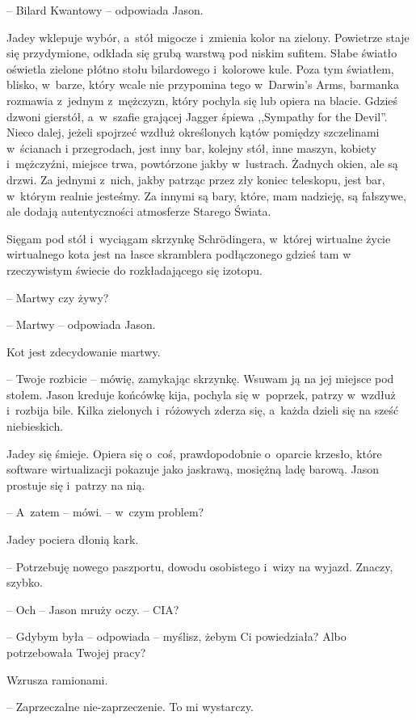 \documentclass[oneside,polish,12pt,sfheadings]{mwbk}
\begin{document}
-- Bilard Kwantowy -- odpowiada Jason.

Jadey wklepuje wybór, a~stół migocze i~zmienia kolor na zielony.
Powietrze staje się przydymione, odkłada się grubą warstwą pod niskim
sufitem. Słabe światło oświetla zielone płótno stołu bilardowego i~kolorowe kule. Poza tym światłem, blisko, w~barze, który wcale nie
przypomina tego w~Darwin's Arms, barmanka rozmawia z~jednym z~mężczyzn,
który pochyla się lub opiera na blacie. Gdzieś dzwoni gierstół, a~w~szafie grającej Jagger śpiewa ,,Sympathy for the Devil''. Nieco dalej,
jeżeli spojrzeć wzdłuż określonych kątów pomiędzy szczelinami w~ścianach
i przegrodach, jest inny bar, kolejny stół, inne maszyn, kobiety i~mężczyźni, miejsce trwa, powtórzone jakby w~lustrach. Żadnych okien, ale
są drzwi. Za jednymi z~nich, jakby patrząc przez zły koniec teleskopu,
jest bar, w~którym realnie jesteśmy. Za innymi są bary, które, mam
nadzieję, są fałszywe, ale dodają autentyczności atmosferze Starego
Świata.

Sięgam pod stół i~wyciągam skrzynkę Schrödingera, w~której wirtualne
życie wirtualnego kota jest na łasce skramblera podłączonego gdzieś tam
w rzeczywistym świecie do rozkładającego się izotopu.

-- Martwy czy żywy?

-- Martwy -- odpowiada Jason.

Kot jest zdecydowanie martwy.

-- Twoje rozbicie -- mówię, zamykając skrzynkę. Wsuwam ją na jej miejsce
pod stołem. Jason kreduje końcówkę kija, pochyla się w~poprzek, patrzy w~wzdłuż i~rozbija bile. Kilka zielonych i~różowych zderza się, a~każda
dzieli się na sześć niebieskich.

Jadey się śmieje. Opiera się o~coś, prawdopodobnie o~oparcie krzesło,
które software wirtualizacji pokazuje jako jaskrawą, mosiężną ladę
barową. Jason prostuje się i~patrzy na nią.

-- A~zatem -- mówi. -- w~czym problem?

Jadey pociera dłonią kark. 

-- Potrzebuję nowego paszportu, dowodu
osobistego i~wizy na wyjazd. Znaczy, szybko.

-- Och -- Jason mruży oczy. -- CIA?

-- Gdybym była -- odpowiada -- myślisz, żebym Ci powiedziała? Albo
potrzebowała Twojej pracy?

Wzrusza ramionami. 

-- Zaprzeczalne nie-zaprzeczenie. To mi wystarczy.
\end{document}
